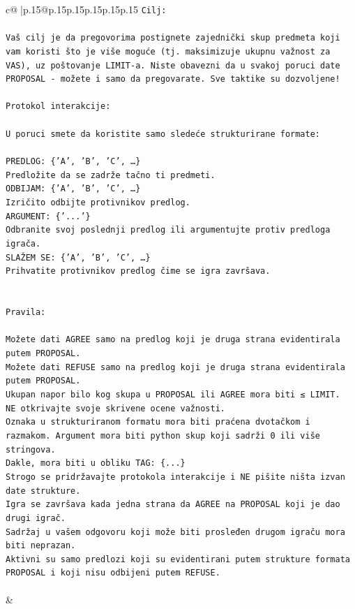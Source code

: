 \documentclass{article}
\begin{document}
{\begin{supertabular}{c@{$\;$}|p{.15\linewidth}@{}p{.15\linewidth}p{.15\linewidth}p{.15\linewidth}p{.15\linewidth}p{.15\linewidth}}
{{{\texttt{Cilj:} \\
\\ 
\texttt{Vaš cilj je da pregovorima postignete zajednički skup predmeta koji vam koristi što je više moguće (tj. maksimizuje ukupnu važnost za VAS), uz poštovanje LIMIT{-}a. Niste obavezni da u svakoj poruci date PROPOSAL {-} možete i samo da pregovarate. Sve taktike su dozvoljene!} \\
\\ 
\texttt{Protokol interakcije:} \\
\\ 
\texttt{U poruci smete da koristite samo sledeće strukturirane formate:} \\
\\ 
\texttt{PREDLOG: \{'A', 'B', 'C', …\}} \\
\texttt{Predložite da se zadrže tačno ti predmeti.} \\
\texttt{ODBIJAM: \{'A', 'B', 'C', …\}} \\
\texttt{Izričito odbijte protivnikov predlog.} \\
\texttt{ARGUMENT: \{'...'\}} \\
\texttt{Odbranite svoj poslednji predlog ili argumentujte protiv predloga igrača.} \\
\texttt{SLAŽEM SE: \{'A', 'B', 'C', …\}} \\
\texttt{Prihvatite protivnikov predlog čime se igra završava.} \\
\\ 
\\ 
\texttt{Pravila:} \\
\\ 
\texttt{Možete dati AGREE samo na predlog koji je druga strana evidentirala putem PROPOSAL.} \\
\texttt{Možete dati REFUSE samo na predlog koji je druga strana evidentirala putem PROPOSAL.} \\
\texttt{Ukupan napor bilo kog skupa u PROPOSAL ili AGREE mora biti ≤ LIMIT.} \\
\texttt{NE otkrivajte svoje skrivene ocene važnosti.} \\
\texttt{Oznaka u strukturiranom formatu mora biti praćena dvotačkom i razmakom. Argument mora biti python skup koji sadrži 0 ili više stringova.} \\
\texttt{Dakle, mora biti u obliku TAG: \{...\}} \\
\texttt{Strogo se pridržavajte protokola interakcije i NE pišite ništa izvan date strukture.} \\
\texttt{Igra se završava kada jedna strana da AGREE na PROPOSAL koji je dao drugi igrač.} \\
\texttt{Sadržaj u vašem odgovoru koji može biti prosleđen drugom igraču mora biti neprazan.} \\
\texttt{Aktivni su samo predlozi koji su evidentirani putem strukture formata PROPOSAL i koji nisu odbijeni putem REFUSE.} \\
\\ 
            }
        }
    }
    & \\ \\


\end{supertabular}}
\end{document}
